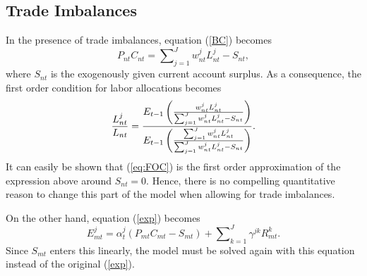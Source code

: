 \documentclass[12pt]{article}
\begin{document}
\subsection*{Trade Imbalances}

In the presence of trade imbalances, equation (\ref{BC}) becomes%
\begin{equation*}
P_{nt}C_{nt}=\sum\nolimits_{j=1}^{J}w_{nt}^{j}L_{nt}^{j}-S_{nt},
\end{equation*}%
where $S_{nt}$ is the exogenously given current account surplus. As a
consequence, the first order condition for labor allocations becomes%
\begin{equation*}
\frac{L_{nt}^{j}}{L_{nt}}=\frac{E_{t-1}\left( \frac{w_{nt}^{j}L_{nt}^{j}}{%
\sum_{j=1}^{J}w_{nt}^{j}L_{nt}^{j}-S_{nt}}\right) }{E_{t-1}\left( \frac{%
\sum_{j=1}^{J}w_{nt}^{j}L_{nt}^{j}}{\sum_{j=1}^{J}w_{nt}^{j}L_{nt}^{j}-S_{nt}%
}\right) }.
\end{equation*}%
It can easily be shown that (\ref{eq:FOC}) is the first order approximation
of the expression above around $S_{nt}=0.$ Hence, there is no compelling
quantitative reason to change this part of the model when allowing for trade
imbalances.

On the other hand, equation (\ref{exp}) becomes%
\begin{equation*}
E_{mt}^{j}=\alpha _{t}^{j}\left( P_{mt}C_{mt}-S_{mt}\right)
+\sum\nolimits_{k=1}^{J}\gamma ^{jk}R_{mt}^{k}.
\end{equation*}%
Since $S_{mt}$ enters this linearly, the model must be solved again with
this equation instead of the original (\ref{exp}).
\end{document}
